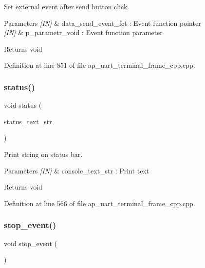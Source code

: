 Set external event after send button click. 


\begin{DoxyParams}{Parameters}
{\em \mbox{[}\+I\+N\mbox{]}} & data\+\_\+send\+\_\+event\+\_\+fct \+: Event function pointer \\
\hline
{\em \mbox{[}\+I\+N\mbox{]}} & p\+\_\+parametr\+\_\+void \+: Event function parameter \\
\hline
\end{DoxyParams}
\begin{DoxyReturn}{Returns}
void 
\end{DoxyReturn}


Definition at line 851 of file ap\+\_\+uart\+\_\+terminal\+\_\+frame\+\_\+cpp.\+cpp.

\mbox{\label{group___u_a_r_t__terminal_gac13ab4f21ab16785861da45f063ce763}} 
\subsubsection{status()}
{\footnotesize\ttfamily void status (\begin{DoxyParamCaption}\item[{wx\+String}]{status\+\_\+text\+\_\+str }\end{DoxyParamCaption})}



Print string on status bar. 


\begin{DoxyParams}{Parameters}
{\em \mbox{[}\+I\+N\mbox{]}} & console\+\_\+text\+\_\+str \+: Print text \\
\hline
\end{DoxyParams}
\begin{DoxyReturn}{Returns}
void 
\end{DoxyReturn}


Definition at line 566 of file ap\+\_\+uart\+\_\+terminal\+\_\+frame\+\_\+cpp.\+cpp.

\mbox{\label{group___u_a_r_t__terminal_ga61053f5526b385827ac19b86c3df0867}} 
\subsubsection{stop\_event()}
{\footnotesize\ttfamily void stop\+\_\+event (\begin{DoxyParamCaption}\item[{void}]{ }\end{DoxyParamCaption})\hspace{0.3cm}{\ttfamily [static]}}



